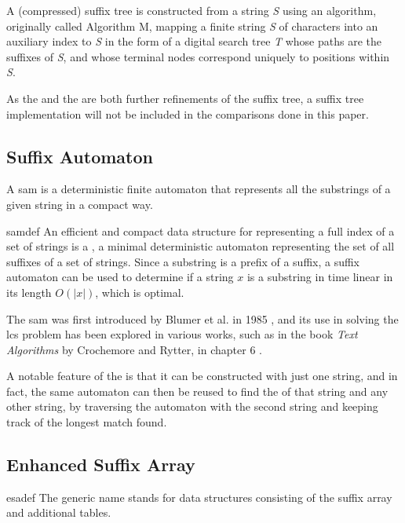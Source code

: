 A (compressed) suffix tree is constructed from a string \textit{S} using an algorithm, originally called Algorithm M, 
mapping a finite string \textit{S} of characters into an auxiliary index to \textit{S} in the form of a 
digital search tree \textit{T} whose paths are the suffixes of \textit{S}, and whose terminal nodes correspond uniquely to positions within \textit{S}\cite{stdef}.

As the  and the  are both further refinements of the suffix tree, a suffix tree implementation will not be included in the comparisons done in this paper.

\subsection{Suffix Automaton}

A \acrfull{sam} is a deterministic finite automaton that represents all the substrings of a given string in a compact way.

\begin{displaycquote}{samdef}
  An efficient and compact data structure for representing a full index of a set of strings is a , a minimal
  deterministic automaton representing the set of all suffixes of a set of strings. Since a substring is a prefix of a suffix, a
  suffix automaton can be used to determine if a string $x$ is a substring in time linear in its length $O(|x|)$, which is optimal.
\end{displaycquote}

The \acrshort{sam} was first introduced by Blumer et al. in 1985 \cite{sam}, 
and its use in solving the \acrshort{lcs} problem has been explored in various works, 
such as in the book \textit{Text Algorithms} by Crochemore and Rytter, in chapter 6 \cite{crochemore1994text}.

A notable feature of the  is that it can be constructed with just one string,
and in fact, the same automaton can then be reused to find the  of that string and any other string, 
by traversing the automaton with the second string and keeping track of the longest match found.

\subsection{Enhanced Suffix Array}

\begin{displaycquote}{esadef}
  The generic name \textit{} stands for data structures consisting of the suffix array and additional tables.
\end{displaycquote}


